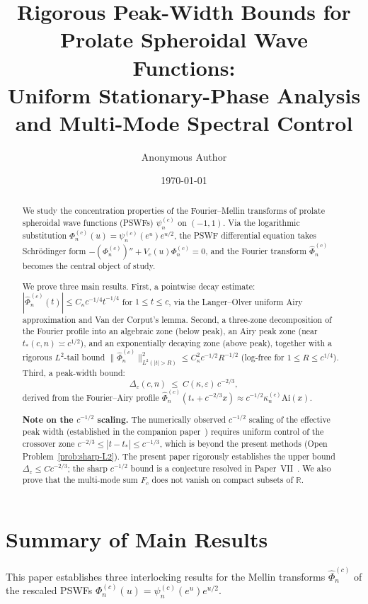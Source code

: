 \documentclass[12pt,a4paper]{amsart}
\title[Rigorous Peak-Width Bounds for PSWFs]{%
Rigorous Peak-Width Bounds for Prolate
Spheroidal Wave Functions:\\
Uniform Stationary-Phase Analysis and
Multi-Mode Spectral Control}
\author{Anonymous Author}
\date{\today}
\theoremstyle{definition}
\theoremstyle{remark}
\newcommand{\Ai}{\mathrm{Ai}}
\begin{document}
\maketitle

\begin{abstract}
We study the concentration properties of the Fourier--Mellin
transforms of prolate spheroidal wave functions (PSWFs)
$\psi_n^{(c)}$ on $(-1,1)$.
Via the logarithmic substitution
$\Phi_n^{(c)}(u)=\psi_n^{(c)}(e^u)e^{u/2}$,
the PSWF differential equation takes Schr\"odinger form
$-(\Phi_n^{(c)})''+V_c(u)\Phi_n^{(c)}=0$,
and the Fourier transform $\widehat\Phi_n^{(c)}$
becomes the central object of study.

We prove three main results.
First, a pointwise decay estimate:
$|\widehat\Phi_n^{(c)}(t)|\le C_\kappa c^{-1/4}t^{-1/4}$
for $1\le t\le c$,
via the Langer--Olver uniform Airy approximation
and Van der Corput's lemma.
Second, a three-zone decomposition of the Fourier profile
into an algebraic zone (below peak),
an Airy peak zone (near $t_*(c,n)\asymp c^{1/2}$),
and an exponentially decaying zone (above peak),
together with a rigorous $L^2$-tail bound
$\|\widehat\Phi_n^{(c)}\|_{L^2(|t|>R)}^2\le C_\kappa^2 c^{-1/2}R^{-1/2}$
(log-free for $1\le R\le c^{1/4}$).
Third, a peak-width bound:
\[
\Delta_\varepsilon(c,n)\;\le\; C(\kappa,\varepsilon)\,c^{-2/3},
\]
derived from the Fourier--Airy profile
$\widehat\Phi_n^{(c)}(t_*+c^{-2/3}x)\approx c^{-1/2}\kappa_n^{(c)}\Ai(x)$.

\textbf{Note on the $c^{-1/2}$ scaling.}
The numerically observed $c^{-1/2}$ scaling of the effective
peak width (established in the companion paper~\cite{PaperV})
requires uniform control of the
crossover zone $c^{-2/3}\le|t-t_*|\le c^{-1/3}$,
which is beyond the present methods
(Open Problem~\ref{prob:sharp-L2}).
The present paper rigorously establishes the upper bound
$\Delta_\varepsilon \le C c^{-2/3}$; the sharp $c^{-1/2}$ bound
is a conjecture resolved in Paper~VII~\cite{PaperVII}.
We also prove that the multi-mode sum $F_c$
does not vanish on compact subsets of $\mathbb{R}$.
\end{abstract}

\section*{Summary of Main Results}

This paper establishes three interlocking results
for the Mellin transforms $\widehat\Phi_n^{(c)}$
of the rescaled PSWFs $\Phi_n^{(c)}(u)=\psi_n^{(c)}(e^u)e^{u/2}$.
\end{document}
